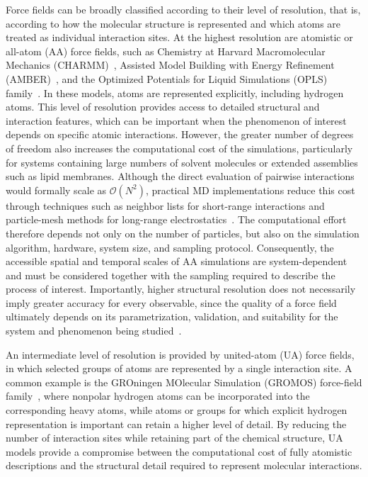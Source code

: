 Force fields can be broadly classified according to their level of resolution, that is, according to how the molecular structure is represented and which atoms are treated as individual interaction sites. At the highest resolution are atomistic or all-atom (AA) force fields, such as Chemistry at Harvard Macromolecular Mechanics (CHARMM)~\cite{charmm}, Assisted Model Building with Energy Refinement (AMBER)~\cite{gaff}, and the Optimized Potentials for Liquid Simulations (OPLS) family~\cite{oplsaa}. In these models, atoms are represented explicitly, including hydrogen atoms. This level of resolution provides access to detailed structural and interaction features, which can be important when the phenomenon of interest depends on specific atomic interactions. However, the greater number of degrees of freedom also increases the computational cost of the simulations, particularly for systems containing large numbers of solvent molecules or extended assemblies such as lipid membranes. Although the direct evaluation of pairwise interactions would formally scale as $\mathcal{O}(N^2)$, practical MD implementations reduce this cost through techniques such as neighbor lists for short-range interactions and particle-mesh methods for long-range electrostatics~\cite{kim2023neighbor,pme}. The computational effort therefore depends not only on the number of particles, but also on the simulation algorithm, hardware, system size, and sampling protocol. Consequently, the accessible spatial and temporal scales of AA simulations are system-dependent and must be considered together with the sampling required to describe the process of interest. Importantly, higher structural resolution does not necessarily imply greater accuracy for every observable, since the quality of a force field ultimately depends on its parametrization, validation, and suitability for the system and phenomenon being studied~\cite{vangunsteren2018validation}.

An intermediate level of resolution is provided by united-atom (UA) force fields, in which selected groups of atoms are represented by a single interaction site. A common example is the GROningen MOlecular Simulation (GROMOS) force-field family~\cite{gromos}, where nonpolar hydrogen atoms can be incorporated into the corresponding heavy atoms, while atoms or groups for which explicit hydrogen representation is important can retain a higher level of detail. By reducing the number of interaction sites while retaining part of the chemical structure, UA models provide a compromise between the computational cost of fully atomistic descriptions and the structural detail required to represent molecular interactions.

